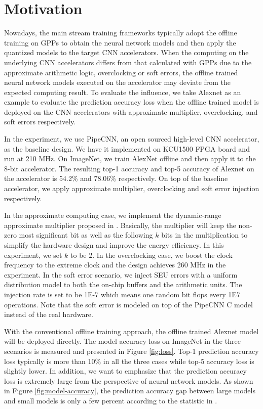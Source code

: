 \section{Motivation} \label{sec:motivation}
Nowadays, the main stream training frameworks typically adopt the offline training
on GPPs to obtain the neural network models and then apply the quantized models to the 
target CNN accelerators. When the computing on the underlying CNN accelerators differs
from that calculated with GPPs due to the approximate arithmetic logic, overclocking or 
soft errors, the offline trained neural network models executed on the accelerator 
may deviate from the expected computing result. To evaluate the influence, 
we take Alexnet as an example to evaluate the prediction 
accuracy loss when the offline trained model is deployed on the CNN 
accelerators with approximate multiplier, overclocking, and soft errors respectively. 

In the experiment, we use PipeCNN\cite{pipecnn_2}, an open sourced high-level CNN accelerator, 
as the baseline design. We have it implemented on KCU1500 FPGA board and run at 210 MHz. 
On ImageNet, we train AlexNet offline and then apply it to the 8-bit accelerator. 
The resulting top-1 accuracy and top-5 accuracy of Alexnet on the accelerator 
is 54.2\% and 78.06\% respectively. On top of the baseline accelerator, we apply 
approximate multiplier, overclocking and soft error injection respectively. 

In the approximate computing case, we implement the dynamic-range approximate 
multiplier proposed in \cite{Approximate_Multiplier_31}. Basically, the multiplier 
will keep the non-zero most significant bit as well as the following $k$ bits in the 
multiplication to simplify the hardware design and improve the energy efficiency.
In this experiment, we set $k$ to be 2. In the overclocking case, we boost the clock frequency 
to the extreme clock and the design achieves 260 MHz in the experiment. 
In the soft error scenario, we inject SEU errors with a uniform distribution model to 
both the on-chip buffers and the arithmetic units. The injection rate is set to be 
1E-7 which means one random bit flops every 1E7 operations. Note that the soft error is modeled 
on top of the PipeCNN C model instead of the real hardware.

With the conventional offline training approach, the offline trained Alexnet model 
will be deployed directly. The model accuracy loss on ImageNet in the three scenarios is 
measured and presented in Figure \ref{fig:loss}. Top-1 prediction accuracy loss 
typically is more than 10\% in all the three cases while top-5 accuracy loss is slightly 
lower. In addition, we want to emphasize that the prediction accuracy loss is extremely large 
from the perspective of neural network models. 
As shown in Figure \ref{fig:model-accuracy}, the prediction accuracy gap between 
large models and small models is only a few percent according to the 
statistic in \cite{model-accuracy}.  

